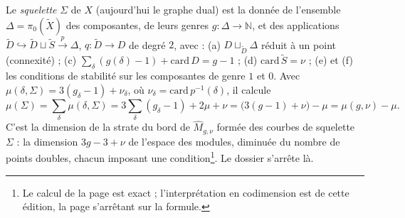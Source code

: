 \documentclass[11pt,a4paper]{article}
\begin{document}
Le \emph{squelette} $\Sigma$ de $X$ (aujourd'hui le graphe dual) est la donnée
de l'ensemble $\Delta = \pi_0(\widetilde{X})$ des composantes, de leurs genres
$g : \Delta \to \mathbb{N}$, et des applications
$\widetilde{D} \hookrightarrow \widetilde{D} \sqcup \widetilde{S} \xrightarrow{p} \Delta$,
$q : \widetilde{D} \to D$ de degré $2$, avec : (a) $D \sqcup_{\widetilde{D}} \Delta$
réduit à un point (connexité) ; (c) $\sum_\delta (g(\delta) - 1) + \mathrm{card}\,D = g - 1$ ;
(d) $\mathrm{card}\,\widetilde{S} = \nu$ ; (e) et (f) les conditions de stabilité
sur les composantes de genre $1$ et $0$. Avec
$\mu(\delta, \Sigma) = 3(g_\delta - 1) + \nu_\delta$, où
$\nu_\delta = \mathrm{card}\,p^{-1}(\delta)$, il calcule
\[
\mu(\Sigma) = \sum_\delta \mu(\delta, \Sigma) = 3\sum_\delta (g_\delta - 1) + 2\mu + \nu
= \bigl(3(g - 1) + \nu\bigr) - \mu = \mu(g, \nu) - \mu .
\]
C'est la dimension de la strate du bord de $\widehat{M}_{g,\nu}$ formée des
courbes de squelette $\Sigma$ : la dimension $3g - 3 + \nu$ de l'espace des
modules, diminuée du nombre de points doubles, chacun imposant une
condition\footnote{Le calcul de la page est exact ; l'interprétation en
codimension est de cette édition, la page s'arrêtant sur la formule.}. Le
dossier s'arrête là.
\end{document}
